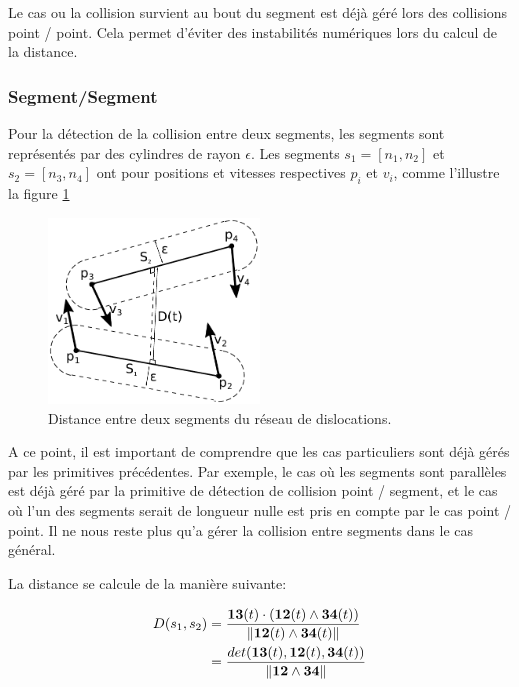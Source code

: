 \documentclass[11pt,class=article,float=false,crop=false]{standalone}
\begin{document}
Le cas ou la collision survient au bout du segment est déjà géré lors des collisions point / point. Cela permet d'éviter des instabilités numériques lors du calcul de la distance.

\subsubsection{Segment/Segment}

Pour la détection de la collision entre deux segments, les segments sont représentés par des cylindres de rayon $\epsilon$. Les segments $s_1 = [n_1,n_2]$ et $s_2 = [n_3,n_4]$ ont pour positions et vitesses respectives $p_i$ et $v_i$, comme l'illustre la figure \ref{fig:collision-primitive-segseg}

\begin{figure}[H]
	\centering
	\includegraphics[width=0.5\textwidth]{img/collision-primitive-segseg}
	\caption{Distance entre deux segments du réseau de dislocations.}
	\label{fig:collision-primitive-segseg}
\end{figure}

A ce point, il est important de comprendre que les cas particuliers sont déjà gérés par les primitives précédentes. Par exemple, le cas où les segments sont parallèles est déjà géré par la primitive de détection de collision point / segment, et le cas où l'un des segments serait de longueur nulle est pris en compte par le cas point / point. Il ne nous reste plus qu'a gérer la collision entre segments dans le cas général. 

La distance se calcule de la manière suivante:

\begin{align}
	D(s_1,s_2) & =\frac{ \bm{13}(t) \cdot (\bm{12}(t) \wedge \bm{34}(t))}
	{\|\bm{12}(t) \wedge \bm{34}(t)\|} \\
	& = \frac{det(\bm{13}(t), \bm{12}(t), \bm{34}(t))}
	{\|\bm{12} \wedge \bm{34}\|} 
\end{align}
\end{document}
